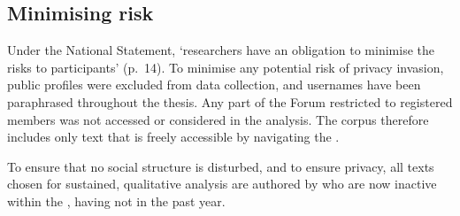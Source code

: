 
\subsection{Minimising risk}

Under the National Statement, `researchers have an obligation to minimise the risks to participants' (p.~14). To minimise any potential risk of privacy invasion,  public profiles were excluded from data collection, and usernames have been paraphrased throughout the thesis. Any part of the \gls{Forum} restricted to registered \glspl{member} was not accessed or considered in the analysis. The \gls{corpus} therefore includes only text that is freely accessible by navigating the .

To ensure that no social structure is disturbed, and to ensure  privacy, all texts chosen for sustained, qualitative analysis are authored by  who are now inactive within the , having not  in the past year.
